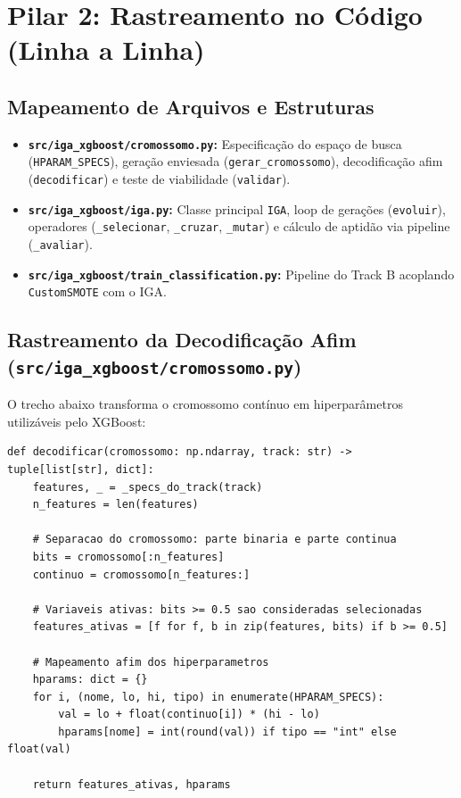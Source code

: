 \documentclass[11pt,a4paper]{article}
\begin{document}
\vspace{0.4cm}
\section{Pilar 2: Rastreamento no Código (Linha a Linha)}

\subsection{Mapeamento de Arquivos e Estruturas}
\begin{itemize}
  \item \textbf{\texttt{src/iga\_xgboost/cromossomo.py}:} Especificação do espaço de busca (\texttt{HPARAM\_SPECS}), geração enviesada (\texttt{gerar\_cromossomo}), decodificação afim (\texttt{decodificar}) e teste de viabilidade (\texttt{validar}).
  \item \textbf{\texttt{src/iga\_xgboost/iga.py}:} Classe principal \texttt{IGA}, loop de gerações (\texttt{evoluir}), operadores (\texttt{\_selecionar}, \texttt{\_cruzar}, \texttt{\_mutar}) e cálculo de aptidão via pipeline (\texttt{\_avaliar}).
  \item \textbf{\texttt{src/iga\_xgboost/train\_classification.py}:} Pipeline do Track B acoplando \texttt{CustomSMOTE} com o IGA.
\end{itemize}

\subsection{Rastreamento da Decodificação Afim (\texttt{src/iga\_xgboost/cromossomo.py})}
O trecho abaixo transforma o cromossomo contínuo em hiperparâmetros utilizáveis pelo XGBoost:

\begin{lstlisting}
def decodificar(cromossomo: np.ndarray, track: str) -> tuple[list[str], dict]:
    features, _ = _specs_do_track(track)
    n_features = len(features)

    # Separacao do cromossomo: parte binaria e parte continua
    bits = cromossomo[:n_features]
    continuo = cromossomo[n_features:]

    # Variaveis ativas: bits >= 0.5 sao consideradas selecionadas
    features_ativas = [f for f, b in zip(features, bits) if b >= 0.5]

    # Mapeamento afim dos hiperparametros
    hparams: dict = {}
    for i, (nome, lo, hi, tipo) in enumerate(HPARAM_SPECS):
        val = lo + float(continuo[i]) * (hi - lo)
        hparams[nome] = int(round(val)) if tipo == "int" else float(val)

    return features_ativas, hparams
\end{lstlisting}
\end{document}
